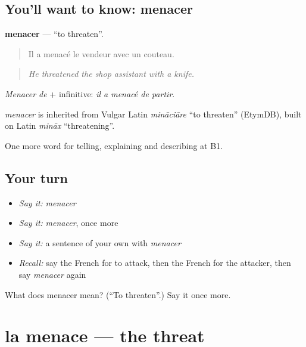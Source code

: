 \subsection*{You'll want to know: menacer}
\textbf{menacer} — \textquotedblleft{}to threaten\textquotedblright{}.

\begin{quote}
Il a menacé le vendeur avec un couteau.
\end{quote}

\begin{quote}
\emph{He threatened the shop assistant with a knife.}
\end{quote}

\emph{Menacer de} + infinitive: \emph{il a menacé de partir}.

\begin{cousinweb}
\emph{menacer} is inherited from Vulgar Latin \emph{mināciāre} \textquotedblleft{}to threaten\textquotedblright{} (EtymDB), built on Latin \emph{mināx} \textquotedblleft{}threatening\textquotedblright{}.
\end{cousinweb}

\begin{grammarlens}[title={What you've built}]
One more word for telling, explaining and describing at B1.
\end{grammarlens}

\subsection*{Your turn}
\begin{itemize}
\raggedright
  \item \emph{Say it:} \emph{menacer}
  \item \emph{Say it:} \emph{menacer}, once more
  \item \emph{Say it:} a sentence of your own with \emph{menacer}
  \item \emph{Recall:} say the French for to attack, then the French for the attacker, then say \emph{menacer} again
\end{itemize}

\begin{tcolorbox}[breakable,colback=teal!4,colframe=teal!35!black,title={Before you move on}]
What does menacer mean? (\textquotedblleft{}To threaten\textquotedblright{}.) Say it once more.
\end{tcolorbox}
\section[la menace]{la menace — the threat}

